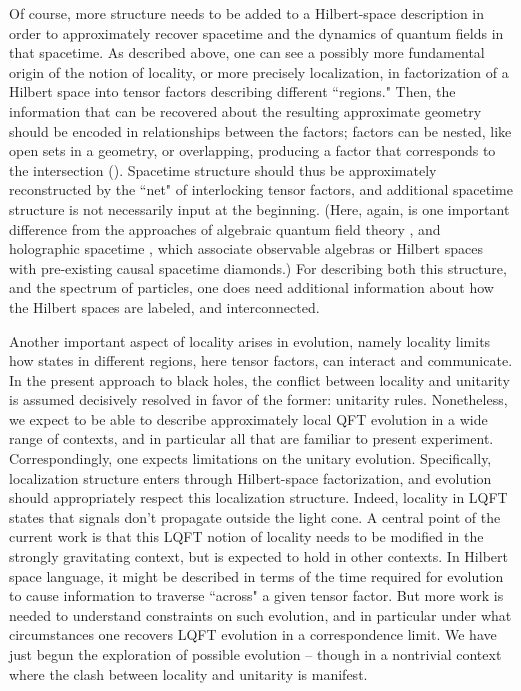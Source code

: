 Of course, more structure needs to be added to a Hilbert-space description in order to approximately recover spacetime and the dynamics of quantum fields in that spacetime.  As described above, one can see a possibly more fundamental origin of the notion of locality, or more precisely localization, in factorization of a Hilbert space into tensor factors describing different ``regions."  Then, the information that can be recovered about the resulting approximate geometry should be encoded in relationships between the factors; factors can be nested, like open sets in a geometry, or overlapping, producing a factor that corresponds to the intersection (\Tensfact).  
Spacetime structure should thus be approximately reconstructed by the ``net" of interlocking tensor factors, and additional spacetime structure is not necessarily input at the beginning.  (Here, again, is one important difference from the approaches of algebraic quantum field theory \Haag, and holographic spacetime \BanksHST, which associate observable algebras or Hilbert spaces with pre-existing causal spacetime diamonds.)  For describing both this structure, and the spectrum of particles, one does need additional information about how the Hilbert spaces are labeled, and interconnected.

Another important aspect of locality arises in evolution, namely locality limits how states in different regions, here tensor factors, can interact and communicate.  In the present approach to black holes, the conflict between locality and unitarity is assumed decisively resolved in favor of the former: unitarity rules.  Nonetheless, we expect to be able to describe approximately local QFT evolution in a wide range of contexts, and in particular all that are familiar to present experiment.  Correspondingly, one expects limitations on the unitary evolution.  Specifically, localization structure enters through Hilbert-space factorization, and evolution should appropriately respect this localization structure.
Indeed, locality in LQFT states that signals don't propagate outside the light cone.  A central point of the current work is that this LQFT notion of locality needs to be modified in the strongly gravitating context, but is expected to hold in other contexts.  In Hilbert space language, it might be described in terms of the time required for evolution  to cause information to traverse ``across" a given tensor factor.  But more work is needed to understand constraints on such evolution, and in particular under what circumstances one recovers LQFT evolution in a correspondence limit.  We have just begun the exploration of possible evolution -- though in a nontrivial context where the clash between locality and unitarity is manifest.

